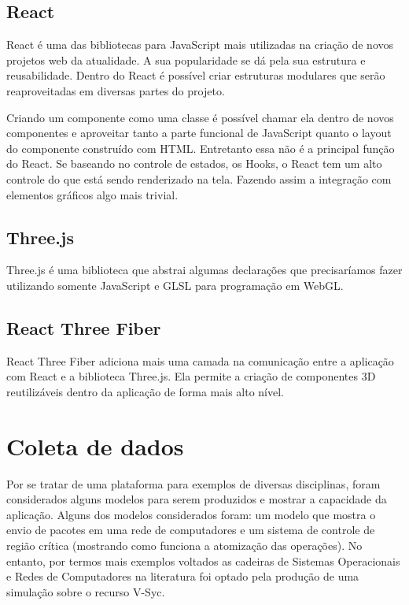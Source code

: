 \documentclass[tcc,capa]{texufpel}
\begin{document}
\subsection{React}

React é uma das bibliotecas para JavaScript mais utilizadas na criação de novos projetos web da atualidade. A sua popularidade se dá pela sua estrutura e reusabilidade. Dentro do React é possível criar estruturas modulares que serão reaproveitadas em diversas partes do projeto. 

Criando um componente como uma classe é possível chamar ela dentro de novos componentes e aproveitar tanto a parte funcional de JavaScript quanto o layout do componente construído com HTML. Entretanto essa não é a principal função do React. Se baseando no controle de estados, os Hooks, o React tem um alto controle do que está sendo renderizado na tela. Fazendo assim a integração com elementos gráficos algo mais trivial.

\subsection{Three.js}

Three.js é uma biblioteca que abstrai algumas declarações que precisaríamos fazer utilizando somente JavaScript e GLSL para programação em WebGL. 

\subsection{React Three Fiber}

React Three Fiber adiciona mais uma camada na comunicação entre a aplicação com React e a biblioteca Three.js. Ela permite a criação de componentes 3D reutilizáveis dentro da aplicação de forma mais alto nível.

\section{Coleta de dados}

Por se tratar de uma plataforma para exemplos de diversas disciplinas, foram considerados alguns modelos para serem produzidos e mostrar a capacidade da aplicação. Alguns dos modelos considerados foram: um modelo que mostra o envio de pacotes em uma rede de computadores e um sistema de controle de região crítica (mostrando como funciona a atomização das operações). No entanto, por termos mais exemplos voltados as cadeiras de Sistemas Operacionais e Redes de Computadores na literatura foi optado pela produção de uma simulação sobre o recurso V-Syc.
\end{document}
